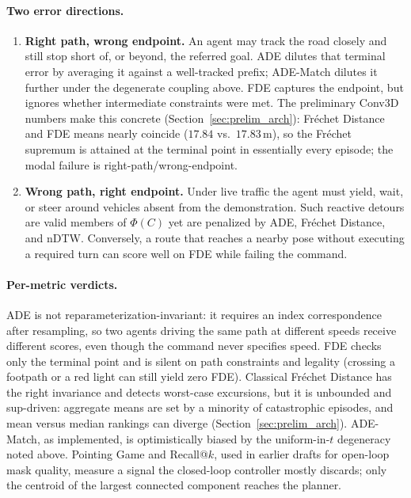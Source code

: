 \paragraph{Two error directions.}
\begin{enumerate}
    \item \textbf{Right path, wrong endpoint.} An agent may track the road closely and still stop short of, or beyond, the referred goal. ADE dilutes that terminal error by averaging it against a well-tracked prefix; ADE-Match dilutes it further under the degenerate coupling above. FDE captures the endpoint, but ignores whether intermediate constraints were met. The preliminary Conv3D numbers make this concrete (Section~\ref{sec:prelim_arch}): Fr\'{e}chet Distance and FDE means nearly coincide ($17.84$ vs.\ $17.83\,\mathrm{m}$), so the Fr\'{e}chet supremum is attained at the terminal point in essentially every episode; the modal failure is right-path/wrong-endpoint.
    \item \textbf{Wrong path, right endpoint.} Under live traffic the agent must yield, wait, or steer around vehicles absent from the demonstration. Such reactive detours are valid members of $\Phi(C)$ yet are penalized by ADE, Fr\'{e}chet Distance, and nDTW. Conversely, a route that reaches a nearby pose without executing a required turn can score well on FDE while failing the command.
\end{enumerate}

\paragraph{Per-metric verdicts.}
ADE is not reparameterization-invariant: it requires an index correspondence after resampling, so two agents driving the same path at different speeds receive different scores, even though the command never specifies speed. FDE checks only the terminal point and is silent on path constraints and legality (crossing a footpath or a red light can still yield zero FDE). Classical Fr\'{e}chet Distance has the right invariance and detects worst-case excursions, but it is unbounded and sup-driven: aggregate means are set by a minority of catastrophic episodes, and mean versus median rankings can diverge (Section~\ref{sec:prelim_arch}). ADE-Match, as implemented, is optimistically biased by the uniform-in-$t$ degeneracy noted above. Pointing Game and Recall@$k$, used in earlier drafts for open-loop mask quality, measure a signal the closed-loop controller mostly discards; only the centroid of the largest connected component reaches the planner.

